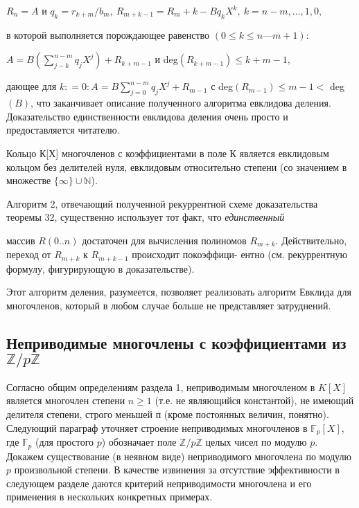 \documentclass{mai_book}
\begin{document}
\begin{center}
\noindent$R_n = A$ и $q_k = r_{k+m}\slash b_m,\: R_{m+k-1}=R_m+k - Bq_kX^k,\: k = n-m,...,1,0,$
\end{center}

\noindent в которой выполняется порождающее равенство $(0 \leq k \leq n — m + 1)$: 

\begin{center}
$A = B\left(\sum_{j-k}^{n-m}q_jX^j\right)+R_{k+m-1}$ и deg$(R_{k+m-1})\leq k+m-1,$
\end{center}

\noindent дающее для $k: = 0: A =B\sum_{j=0}^{n-m}q_jX^j + R_{m-1}$ с deg$(R_{m-1}) \leq m - 1 <$ 
deg$(B)$, что заканчивает описание полученного алгоритма евклидова 
деления. Доказательство единственности евклидова деления очень  
просто и предоставляется читателю. 

\begin{sled}
\hspace*{0.5cm}Кольцо К[Х] многочленов с коэффициентами в поле К является  
евклидовым кольцом без делителей нуля, евклидовым относительно  
степени (со значением в множестве $\{\infty\}\cup \mathbb{N}$).\newline
\end{sled}

Алгоритм 2, отвечающий полученной рекуррентной схеме  
доказательства теоремы 32, существенно использует тот факт, что \textit{единственный}
\newpage

\noindent массив $R(0 .. n)$ достаточен для вычисления полиномов $R_{m+k}$. 
Действительно, переход от $R_{m+k}$ к $R_{m+k-1}$ происходит покоэффици- 
ентно (см. рекуррентную формулу, фигурирующую в доказательстве).
 
Этот алгоритм деления, разумеется, позволяет реализовать  
алгоритм Евклида для многочленов, который в любом случае больше не 
представляет затруднений. 
\subsection{Неприводимые многочлены с коэффициентами из $\mathbb{Z}\slash p\mathbb{Z}$} 
Согласно общим определениям раздела 1, неприводимым многочленом 
в $K[X]$ является многочлен степени $n\geq 1$ (т.е. не являющийся  
константой), не имеющий делителя степени, строго меньшей п (кроме  
постоянных величин, понятно). Следующий параграф уточняет строение 
неприводимых многочленов в $\mathbb{F}_p[X]$, где $\mathbb{F}_p$ (для простого $p$) обозначает 
поле $\mathbb{Z}\slash p\mathbb{Z}$ целых чисел по модулю $p$. Докажем существование (в неявном 
виде) неприводимого многочлена по модулю $p$ произвольной степени. 
В качестве извинения за отсутствие эффективности в следующем  
разделе даются критерий неприводимости многочлена и его применения в 
нескольких конкретных примерах. 
\end{document}
